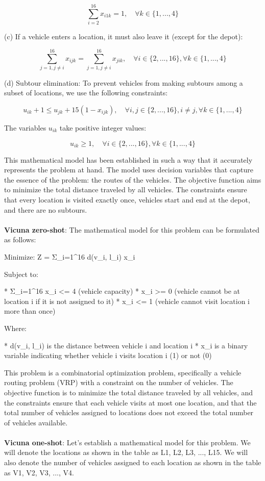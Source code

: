 \documentclass{article}%
\begin{document}
    \[ \sum_{i=2}^{16} x_{i1k} = 1, \quad \forall k \in \{1,...,4\} \]

   (c) If a vehicle enters a location, it must also leave it (except for the depot):

    \[ \sum_{j=1, j \neq i}^{16} x_{ijk} = \sum_{j=1, j \neq i}^{16} x_{jik}, \quad \forall i \in \{2,...,16\}, \forall k \in \{1,...,4\} \]

   (d) Subtour elimination: To prevent vehicles from making subtours among a subset of locations, we use the following constraints:

    \[ u_{ik} + 1 \leq u_{jk} + 15 (1 - x_{ijk}), \quad \forall i,j \in \{2,...,16\}, i \neq j, \forall k \in \{1,...,4\} \]

    The variables $u_{ik}$ take positive integer values:

    \[ u_{ik} \geq 1, \quad \forall i \in \{2,...,16\}, \forall k \in \{1,...,4\} \]

This mathematical model has been established in such a way that it accurately represents the problem at hand. The model uses decision variables that capture the essence of the problem: the routes of the vehicles. The objective function aims to minimize the total distance traveled by all vehicles. The constraints ensure that every location is visited exactly once, vehicles start and end at the depot, and there are no subtours.\\\\%
\textbf{Vicuna zero-shot}: The mathematical model for this problem can be formulated as follows:

Minimize: Z = Σ\_{i=1}^{16} d(v\_i, l\_i) \* x\_i

Subject to:

* Σ\_{i=1}^{16} x\_i <= 4 (vehicle capacity)
* x\_i >= 0 (vehicle cannot be at location i if it is not assigned to it)
* x\_i <= 1 (vehicle cannot visit location i more than once)

Where:

* d(v\_i, l\_i) is the distance between vehicle i and location i
* x\_i is a binary variable indicating whether vehicle i visits location i (1) or not (0)

This problem is a combinatorial optimization problem, specifically a vehicle routing problem (VRP) with a constraint on the number of vehicles. The objective function is to minimize the total distance traveled by all vehicles, and the constraints ensure that each vehicle visits at most one location, and that the total number of vehicles assigned to locations does not exceed the total number of vehicles available.\\\\%
\textbf{Vicuna one-shot}: Let's establish a mathematical model for this problem. We will denote the locations as shown in the table as L1, L2, L3, ..., L15. We will also denote the number of vehicles assigned to each location as shown in the table as V1, V2, V3, ..., V4.
\end{document}
